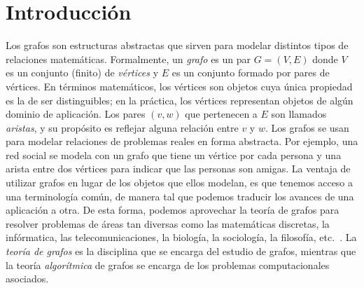 \documentclass[%
    a4paper,%
    fontsize=12pt,%
    DIV=12,
    twoside,%
    openright,%
    titlepage=true,%
    headsepline,%
    toc=bibliography,%
    parskip=half,%
    cleardoublepage=empty,%
    headings=big,%
]{scrbook}
\begin{document}
% 
% 
% 

\tableofcontents

\mainmatter

\chapter{Introducción}
\label{sec:introduccion}

Los grafos son estructuras abstractas que sirven para modelar distintos tipos de relaciones matemáticas.  Formalmente, un \emph{grafo} es un par $G = (V, E)$ donde $V$ es un conjunto (finito) de \emph{vértices} y $E$ es un conjunto formado por pares de vértices.  En términos matemáticos, los vértices son objetos cuya única propiedad es la de ser distinguibles; en la práctica, los vértices representan objetos de algún dominio de aplicación.  Los pares $(v,w)$ que pertenecen a $E$ son llamados \emph{aristas}, y su propósito es reflejar alguna relación entre $v$ y $w$.  Los grafos se usan para modelar relaciones de problemas reales en forma abstracta.  Por ejemplo, una red social se modela con un grafo que tiene un vértice por cada persona y una arista entre dos vértices para indicar que las personas son amigas.  La ventaja de utilizar grafos en lugar de los objetos que ellos modelan, es que tenemos acceso a una terminología común, de manera tal que podemos traducir los avances de una aplicación a otra.  De esta forma, podemos aprovechar la teoría de grafos para resolver problemas de áreas tan diversas como las matemáticas discretas, la infórmatica, las telecomunicaciones, la biología, la sociología, la filosofía, etc.~\cite{GrossYellen2006}.  La \emph{teoría de grafos} es la disciplina que se encarga del estudio de grafos, mientras que la teoría \emph{algorítmica} de grafos se encarga de los problemas computacionales asociados.
\end{document}
